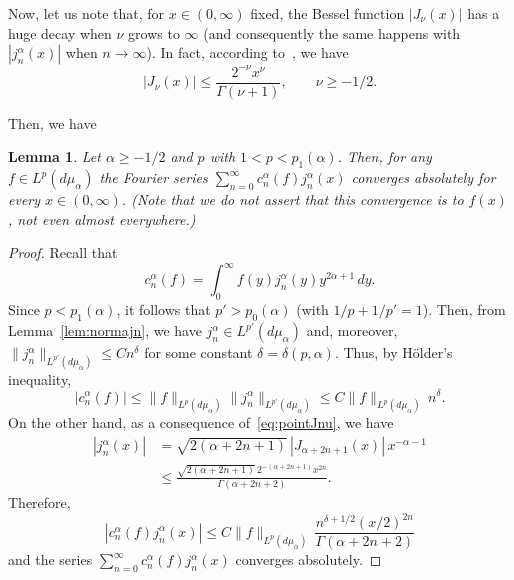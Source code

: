 \documentclass[10pt,a4paper]{article}
\newcommand{\mua}{d\mu_\alpha}
\newcommand{\jna}{j_n^{\alpha}}
\newcommand{\cna}{c_n^{\alpha}}
\newcommand{\lpnorm}[3]{\|{#1}\|_{L^{#2}({#3})}} %
\theoremstyle{plain}
\newtheorem{lem}{Lemma}
\begin{document}
Now, let us note that, for $x \in (0,\infty)$ fixed, the Bessel function $|J_\nu(x)|$ has a huge decay when $\nu$ grows to $\infty$ (and consequently the same happens with $|\jna(x)|$ when $n \to \infty$). In fact, according to~\cite[Ch.~III, 3.31 (1), p.~49]{Wat}, we have
\begin{equation}
\label{eq:pointJnu}
   |J_\nu(x)| \leq \frac{2^{-\nu} x^\nu}{\Gamma(\nu+1)},
   \qquad \nu \ge -1/2.
\end{equation}

Then, we have

\begin{lem}
\label{lem:convae}
Let $\alpha \ge -1/2$ and $p$ with $1 < p < p_1(\alpha)$.
Then, for any $f \in L^p(\mua)$ the Fourier series $\sum_{n=0}^\infty \cna(f)\jna(x)$ converges absolutely for every $x \in (0,\infty)$. (Note that we do not assert that this convergence is to $f(x)$, not even almost everywhere.)
\end{lem}

\begin{proof}
Recall that
\begin{equation}
\label{eq:fourier}
  \cna(f) = \int_0^\infty f(y) \jna(y) y^{2\alpha+1} \, dy.
\end{equation}
Since $p < p_1(\alpha)$, it follows that $p' > p_0(\alpha)$ (with $1/p + 1/p' = 1$).
Then, from Lemma~\ref{lem:normajn}, we have
$\jna \in L^{p'}(\mua)$ and, moreover,
$\lpnorm{\jna}{p'}{\mua} \le C n^\delta$
for some constant $\delta = \delta(p,\alpha)$. Thus,
by H\"older's inequality,
\begin{equation*}
   |\cna(f)|
   \le \lpnorm{f}p{\mua}
       \lpnorm{\jna}{p'}{\mua}
   \le C \lpnorm{f}p{\mua}\,n^\delta.
\end{equation*}
On the other hand, as a consequence of~\eqref{eq:pointJnu}, we have
\begin{align*} 
   |\jna(x)|
   &= \sqrt{2(\alpha+2n+1)}\,|J_{\alpha+2n+1}(x)|
   \,x^{-\alpha-1} \\
   &\leq \frac{\sqrt{2(\alpha+2n+1)}\,2^{-(\alpha+2n+1)} x^{2n}}
             {\Gamma(\alpha+2n+2)}.
\end{align*}
Therefore,
\begin{equation}
\label{eq:summand}
   |\cna(f) \jna(x)| \leq C \lpnorm{f}p{\mua}
   \,\frac{n^{\delta+1/2} (x/2)^{2n}}{\Gamma(\alpha+2n+2)}
\end{equation}
and the series $\sum_{n=0}^\infty \cna(f) \jna(x)$ converges absolutely.
\end{proof}
\end{document}
